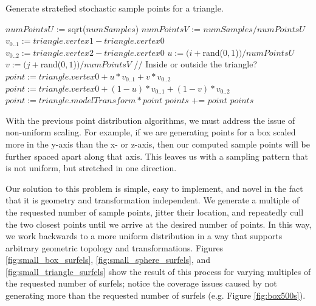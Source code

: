\begin{algorithm}[H]
\captionfont
\caption[Triangle point generation]{Generate stratefied stochastic sample points for a triangle.}
\label{alg:triangle_point_gen}
{\fontsize{10}{9}\selectfont
\begin{algorithmic}
      \State $numPointsU$ := sqrt($numSamples$)
      \State $numPointsV$ := $numSamples / numPointsU$
      \State $v_{0..1} := triangle.vertex1 - triangle.vertex0$
      \State $v_{0..2} := triangle.vertex2 - triangle.vertex0$
            \State $u := (i + $rand($0,1$)$) / numPointsU$
            \State $v := (j + $rand($0,1$)$) / numPointsV$
            \State // Inside or outside the triangle?
               \State $point := triangle.vertex0 + u*v_{0..1} + v*v_{0..2}$
            \Else
               \State $point := triangle.vertex0 + (1-u)*v_{0..1} + (1-v)*v_{0..2}$
            \EndIf
            \State $point := triangle.modelTransform * point$
            \State $points$ += $point$
         \EndFor
      \EndFor
      \State \Return $points$
   \EndFunction
\end{algorithmic}
}
\end{algorithm}

With the previous point distribution algorithms, we must address the issue of non-uniform scaling. For example, if we are generating points for a box scaled more in the y-axis than the x- or z-axis, then our computed sample points will be further spaced apart along that axis. This leaves us with a sampling pattern that is not uniform, but stretched in one direction.

Our solution to this problem is simple, easy to implement, and novel in the fact that it is geometry and transformation independent. We generate a multiple of the requested number of sample points, jitter their location, and repeatedly cull the two closest points until we arrive at the desired number of points. In this way, we work backwards to a more uniform distribution in a way that supports arbitrary geometric topology and transformations. Figures \ref{fig:small_box_surfels}, \ref{fig:small_sphere_surfels}, and \ref{fig:small_triangle_surfels} show the result of this process for varying multiples of the requested number of surfels; notice the coverage issues caused by not generating more than the requested number of surfels (e.g. Figure \ref{fig:box500s}).

